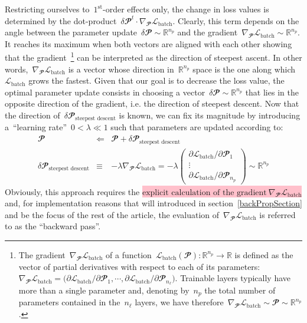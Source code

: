 \documentclass{article}
\newcommand{\mathcolorbox}[2]{\colorbox{#1}{$\displaystyle #2$}}
\begin{document}
\begin{enumerate}
Restricting ourselves to~$1^\text{st}$-order effects only, the change in loss values is determined by the dot-product~$\delta \mathbfcal{P}^t \cdot \nabla_\mathbfcal{P} \mathcal{L}_\text{batch}$.  Clearly, this term depends on the angle between the parameter update~$\delta \mathbfcal{P} \sim \mathbb{R}^{n_p}$ and the gradient~$\nabla_\mathbfcal{P} \mathcal{L}_\text{batch} \sim \mathbb{R}^{n_p}$. It reaches its maximum when both vectors are aligned with each other showing that the gradient~\footnote{\label{noteGrad} The gradient~$\nabla_\mathbfcal{P} \mathcal{L}_\text{batch}$ of a function~$\mathcal{L}_\text{batch} (\mathbfcal{P}) : \mathbb{R}^{n_p} \rightarrow \mathbb{R}$ is defined as the vector of partial derivatives with respect to each of its parameters:~$\nabla_\mathbfcal{P} \mathcal{L}_\text{batch} = \big( \partial \mathcal{L}_\text{batch} / \partial \mathbfcal{P}_1, \cdots, \partial \mathcal{L}_\text{batch} / \partial \mathbfcal{P}_{n_\ell} \big)$. Trainable layers typically have more than a single parameter and, denoting by~$n_p$ the total number of parameters contained in the~$n_\ell$ layers, we have therefore~$\nabla_\mathbfcal{P} \mathcal{L}_\text{batch} \sim \mathbfcal{P} \sim \mathbb{R}^{n_p}$.} can be interpreted as the direction of steepest ascent.  In other words,~$\nabla_\mathbfcal{P} \mathcal{L}_\text{batch}$ is a vector whose direction in~$\mathbb{R}^{n_p}$ space is the one along which~$\mathcal{L}_\text{batch}$ grows the fastest.  Given that our goal is to decrease the loss value, the optimal parameter update consists in choosing a vector~$\delta \mathbfcal{P} \sim \mathbb{R}^{n_p}$ that lies in the opposite direction of the gradient, i.e. the direction of steepest descent. Now that the direction of~$\delta \mathbfcal{P}_\text{steepest descent}$  is known, we can fix its magnitude by introducing a~``learning rate''~$0 < \lambda \ll 1$ such that parameters are updated according to:
\begin{eqnarray}
\mathbfcal{P} &\Longleftarrow& \mathbfcal{P} + \delta \mathbfcal{P}_\text{steepest descent}
\label{eq:steepestUpdateA} \\
\delta \mathbfcal{P}_\text{steepest descent} &\equiv&   - \lambda \nabla_\mathbfcal{P} \mathcal{L}_\text{batch}  = -\lambda \left( 
\begin{matrix}
\partial \mathcal{L}_\text{batch} / \partial \mathbfcal{P}_1  \\
\vdots \\
\partial \mathcal{L}_\text{batch} / \partial \mathbfcal{P}_{n_p}
\end{matrix} 
\right) \sim \mathbb{R}^{n_p}
\label{eq:steepestUpdateB}
\end{eqnarray}
Obviously, this approach requires the \mathcolorbox{pink}{\text{explicit calculation of the gradient}~\nabla_\mathbfcal{P} \mathcal{L}_\text{batch}} and, for implementation reasons that will introduced in section~\ref{backPropSection} and be the focus of the rest of the article, the evaluation of~$\nabla_\mathbfcal{P} \mathcal{L}_\text{batch}$ is referred to as the ``backward pass''. \\


\end{enumerate}
\end{document}
